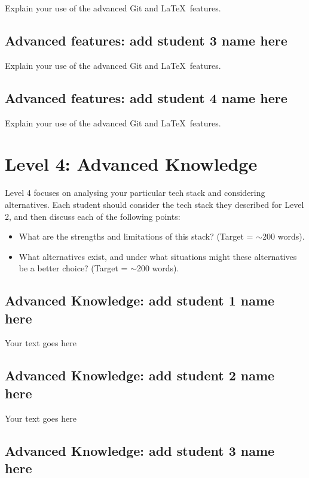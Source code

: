 \documentclass[a4paper, 11pt]{report}
\begin{document}
	Explain your use of the advanced Git and \LaTeX\ features. 
	
	\subsection{Advanced features: add student 3 name here}
	
	Explain your use of the advanced Git and \LaTeX\ features. 
	
	\subsection{Advanced features: add student 4 name here}
	
	Explain your use of the advanced Git and \LaTeX\ features. 
	
	
	
	
	\newpage
	\section{Level 4: Advanced Knowledge}
	
	Level 4 focuses on analysing your particular tech stack and considering alternatives. Each student should consider the tech stack they described for Level 2, and then discuss each of the following points:
	\begin{itemize}
		\item What are the strengths and limitations of this stack? (Target = $\sim$200 words).
		\item What alternatives exist, and under what situations might these alternatives be a better choice? (Target = $\sim$200 words).
	\end{itemize}
	
	\subsection{Advanced Knowledge: add student 1 name here}
	
	Your text goes here
	
	\subsection{Advanced Knowledge: add student 2 name here}
	
	Your text goes here
	
	\subsection{Advanced Knowledge: add student 3 name here}
	
\end{document}
